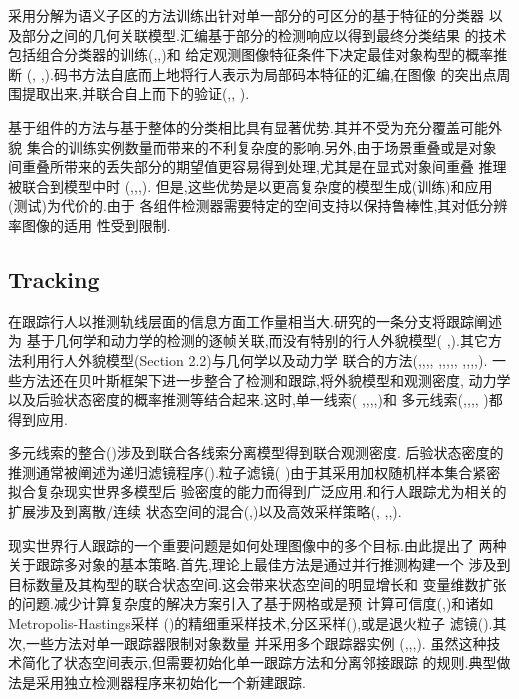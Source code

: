 \documentclass[10pt,letterpaper,journal,compsoc]{IEEEtran}
\begin{document}
采用分解为语义子区的方法训练出针对单一部分的可区分的基于特征的分类器
以及部分之间的几何关联模型.汇编基于部分的检测响应以得到最终分类结果
的技术包括组合分类器的训练(\cite{bib2},\cite{bib48},\cite{bib62})和
给定观测图像特征条件下决定最佳对象构型的概率推断
(\cite{bib45},\cite{bib65}
,\cite{bib76}).码书方法自底而上地将行人表示为局部码本特征的汇编,在图像
的突出点周围提取出来,并联合自上而下的验证(\cite{bib39},\cite{bib40},
\cite{bib61}).

基于组件的方法与基于整体的分类相比具有显著优势.其并不受为充分覆盖可能外貌
集合的训练实例数量而带来的不利复杂度的影响.另外,由于场景重叠或是对象
间重叠所带来的丢失部分的期望值更容易得到处理,尤其是在显式对象间重叠
推理被联合到模型中时
(\cite{bib39},\cite{bib40},\cite{bib61},\cite{bib76}).
但是,这些优势是以更高复杂度的模型生成(训练)和应用(测试)为代价的.由于
各组件检测器需要特定的空间支持以保持鲁棒性,其对低分辨率图像的适用
性受到限制.
\subsection{Tracking}
在跟踪行人以推测轨线层面的信息方面工作量相当大.研究的一条分支将跟踪阐述为
基于几何学和动力学的检测的逐帧关联,而没有特别的行人外貌模型(\cite{bib2}
,\cite{bib23}).其它方法利用行人外貌模型(Section 2.2)与几何学以及动力学
联合的方法(\cite{bib4},\cite{bib26},\cite{bib32},\cite{bib39},
\cite{bib43},\cite{bib50},\cite{bib55},\cite{bib58},\cite{bib65},
\cite{bib70},\cite{bib76},\cite{bib77},\cite{bib80},\cite{bib82}).
一些方法还在贝叶斯框架下进一步整合了检测和跟踪,将外貌模型和观测密度,
动力学以及后验状态密度的概率推测等结合起来.这时,单一线索(
\cite{bib4},\cite{bib26},\cite{bib55},\cite{bib70},\cite{bib76})和
多元线索(\cite{bib32},\cite{bib43},\cite{bib50},\cite{bib58},
\cite{bib65})都得到应用.

多元线索的整合(\cite{bib66})涉及到联合各线索分离模型得到联合观测密度.
后验状态密度的推测通常被阐述为递归滤镜程序(\cite{bib3}).粒子滤镜(
\cite{bib30})由于其采用加权随机样本集合紧密拟合复杂现实世界多模型后
验密度的能力而得到广泛应用.和行人跟踪尤为相关的扩展涉及到离散/连续
状态空间的混合(\cite{bib26},\cite{bib50})以及高效采样策略(\cite{bib13},
\cite{bib32},\cite{bib36},\cite{bib44}).

现实世界行人跟踪的一个重要问题是如何处理图像中的多个目标.由此提出了
两种关于跟踪多对象的基本策略.首先,理论上最佳方法是通过并行推测构建一个
涉及到目标数量及其构型的联合状态空间.这会带来状态空间的明显增长和
变量维数扩张的问题.减少计算复杂度的解决方案引入了基于网格或是预
计算可信度(\cite{bib32},\cite{bib69})和诸如Metropolis-Hastings采样
(\cite{bib36})的精细重采样技术,分区采样(\cite{bib44}),或是退火粒子
滤镜(\cite{bib13}).其次,一些方法对单一跟踪器限制对象数量
并采用多个跟踪器实例
(\cite{bib31},\cite{bib35},\cite{bib50},\cite{bib52}).
虽然这种技术简化了状态空间表示,但需要初始化单一跟踪方法和分离邻接跟踪
的规则.典型做法是采用独立检测器程序来初始化一个新建跟踪.
\end{document}

